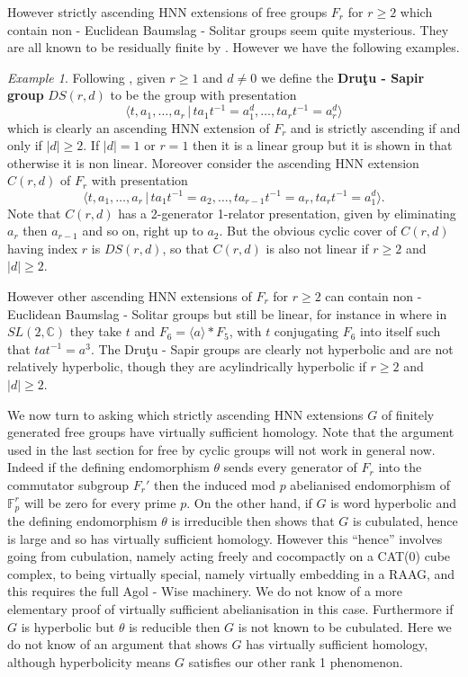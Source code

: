 \documentclass[11pt,reqno]{amsart}
\numberwithin{equation}{section}
\newcommand{\Cc}{\mathbb{C}}
\newcommand{\F}{\mathbb{F}}
\newcommand{\geqs}{\geqslant}
\theoremstyle{definition}
\theoremstyle{remark}
\newtheorem{ex}[thm]{Example}
\begin{document}
However strictly ascending HNN extensions of free groups $F_r$ for
$r\geqs 2$ which contain non - Euclidean Baumslag - Solitar
groups seem quite mysterious.
They are all known to be residually finite by \cite{bs}.
However we have the following examples.
\begin{ex} \label{drsp}
  Following \cite{drusap}, given $r\geqs 1$ and $d\neq 0$ we define
  the {\bf Dru\c{t}u - Sapir group} $DS(r,d)$ to be the group
  with presentation
  \[\langle t,a_1,\ldots ,a_r\,|\,ta_1t^{-1}=a_1^d, \ldots ,ta_rt^{-1}=a_r^d
    \rangle\]
  which is clearly an ascending HNN extension of $F_r$ and is strictly
  ascending if and only if $|d|\geqs 2$. If $|d|=1$ or $r=1$ then it is
  a linear group but it is shown in \cite{drusap} that otherwise it is
  non linear. Moreover consider the ascending HNN extension $C(r,d)$
  of $F_r$ with presentation
  \[\langle t,a_1,\ldots ,a_r\,|\,ta_1t^{-1}=a_2, \ldots ,
    ta_{r-1}t^{-1}=a_r,ta_rt^{-1}=a_1^d
    \rangle.\]
  Note that $C(r,d)$ has a 2-generator 1-relator presentation, given by
  eliminating $a_r$ then $a_{r-1}$ and so on, right up to $a_2$. But the
  obvious cyclic cover of $C(r,d)$ having index $r$ is $DS(r,d)$, so
  that $C(r,d)$ is also not linear if $r\geqs 2$ and $|d|\geqs 2$.
\end{ex}

However other ascending HNN extensions of $F_r$ for $r\geqs 2$
can contain non - Euclidean Baumslag - Solitar groups but still be
linear, for instance in \cite{caldun} where in $SL(2,\Cc)$ they take
$t$ and $F_6=\langle a\rangle *F_5$, with $t$ conjugating $F_6$ into itself
such that $tat^{-1}=a^3$.
The Dru\c{t}u - Sapir groups are clearly not hyperbolic and are not
relatively hyperbolic, though they are acylindrically hyperbolic if
$r\geqs 2$ and $|d|\geq 2$.


We now turn to asking which strictly ascending HNN extensions $G$ of finitely
generated free groups have virtually sufficient homology. Note that the
argument used in the last section for free by cyclic groups will not work in
general now. Indeed if the defining endomorphism $\theta$ sends every
generator of $F_r$ into the commutator subgroup $F_r'$ then the induced
mod $p$ abelianised endomorphism of $\F_p^r$ will be zero for every prime $p$.
On the other hand, if $G$ is word
hyperbolic and the defining endomorphism $\theta$ is irreducible then
\cite{hgws} shows that $G$ is cubulated, hence is large and so has
virtually sufficient homology. However this ``hence'' involves going from
cubulation, namely acting freely and cocompactly on a CAT(0) cube complex,
to being virtually special, namely virtually embedding in a RAAG, and this
requires the full Agol - Wise machinery. We do not know of a more elementary
proof of virtually sufficient abelianisation in this case.
Furthermore if $G$ is hyperbolic but $\theta$ is reducible then $G$ is not
known to be cubulated. Here we do not know of an argument that shows
$G$ has virtually sufficient homology, although hyperbolicity means $G$
satisfies our other rank 1 phenomenon.
\end{document}
